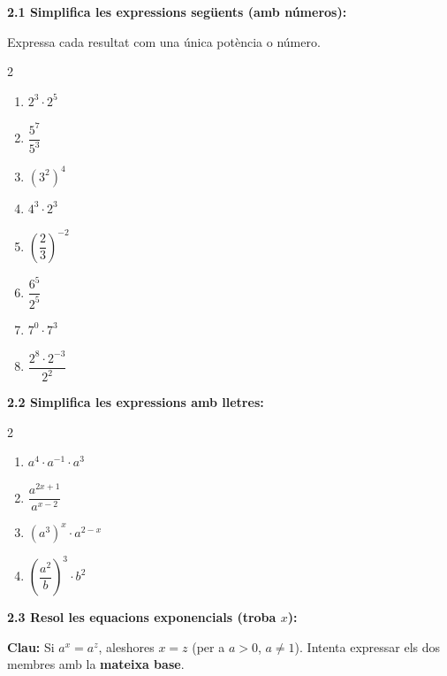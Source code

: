 \documentclass[12pt,a4paper]{article}
\begin{document}
\noindent\textbf{2.1 \; Simplifica les expressions seg\"uents (amb n\'umeros):}

\vspace{0.2cm}
Expressa cada resultat com una \'unica pot\`encia o n\'umero.

\begin{multicols}{2}
\begin{enumerate}[label=\textbf{\alph*)}, leftmargin=1.2cm, itemsep=0.6cm]
    \item $2^3 \cdot 2^5$
    \item $\dfrac{5^7}{5^3}$
    \item $(3^2)^4$
    \item $4^3 \cdot 2^3$
    \item $\left(\dfrac{2}{3}\right)^{-2}$
    \item $\dfrac{6^5}{2^5}$
    \item $7^0 \cdot 7^3$
    \item $\dfrac{2^8 \cdot 2^{-3}}{2^2}$
\end{enumerate}
\end{multicols}

\vspace{0.6cm}

\noindent\textbf{2.2 \; Simplifica les expressions amb lletres:}

\begin{multicols}{2}
\begin{enumerate}[label=\textbf{\alph*)}, leftmargin=1.2cm, itemsep=0.6cm]
    \item $a^4 \cdot a^{-1} \cdot a^3$
    \item $\dfrac{a^{2x+1}}{a^{x-2}}$
    \item $(a^3)^x \cdot a^{2-x}$
    \item $\left(\dfrac{a^2}{b}\right)^3 \cdot b^2$
\end{enumerate}
\end{multicols}

\vspace{0.6cm}

\noindent\textbf{2.3 \; Resol les equacions exponencials (troba $x$):}

\vspace{0.2cm}
\begin{recordatori}
\textbf{Clau:} Si $a^x = a^z$, aleshores $x = z$ (per a $a > 0$, $a \neq 1$). Intenta expressar els dos membres amb la \textbf{mateixa base}.
\end{recordatori}

\vspace{0.2cm}
\end{document}
